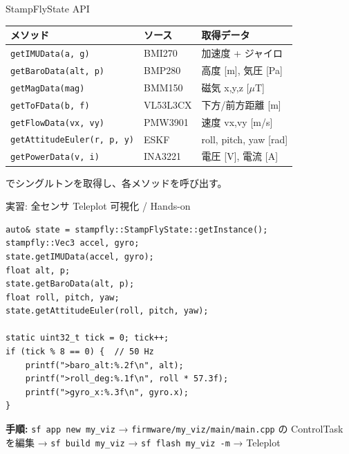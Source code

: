 \begin{frame}{StampFlyState API}
  \vspace{0.3em}
  {\small
  \begin{tabular}{lll}
    \hline
    \textbf{メソッド} & \textbf{ソース} & \textbf{取得データ} \\
    \hline
    \texttt{getIMUData(a, g)}           & BMI270          & 加速度 + ジャイロ \\
    \texttt{getBaroData(alt, p)}        & BMP280          & 高度 [m], 気圧 [Pa] \\
    \texttt{getMagData(mag)}            & BMM150          & 磁気 x,y,z [$\mu$T] \\
    \texttt{getToFData(b, f)}           & VL53L3CX        & 下方/前方距離 [m] \\
    \texttt{getFlowData(vx, vy)}        & PMW3901         & 速度 vx,vy [m/s] \\
    \texttt{getAttitudeEuler(r, p, y)}  & ESKF            & roll, pitch, yaw [rad] \\
    \texttt{getPowerData(v, i)}         & INA3221         & 電圧 [V], 電流 [A] \\
    \hline
  \end{tabular}
  }

  \vspace{0.5em}
  {\footnotesize
     でシングルトンを取得し、各メソッドを呼び出す。
  }
\end{frame}

\begin{frame}[fragile]{実習: 全センサ Teleplot 可視化 / Hands-on}
  \begin{lstlisting}[style=sfcpp, basicstyle=\ttfamily\scriptsize]
auto& state = stampfly::StampFlyState::getInstance();
stampfly::Vec3 accel, gyro;
state.getIMUData(accel, gyro);
float alt, p;
state.getBaroData(alt, p);
float roll, pitch, yaw;
state.getAttitudeEuler(roll, pitch, yaw);

static uint32_t tick = 0; tick++;
if (tick % 8 == 0) {  // 50 Hz
    printf(">baro_alt:%.2f\n", alt);
    printf(">roll_deg:%.1f\n", roll * 57.3f);
    printf(">gyro_x:%.3f\n", gyro.x);
}
  \end{lstlisting}

  {\footnotesize
    \textbf{手順:} \texttt{sf app new my\_viz} → \texttt{firmware/my\_viz/main/main.cpp} の
    ControlTask を編集 → \texttt{sf build my\_viz} → \texttt{sf flash my\_viz -m} → Teleplot
  }
\end{frame}

